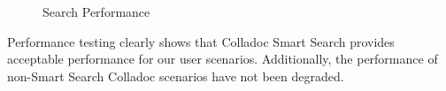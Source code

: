 \begin{figure}[h!t]
\begin{center}
\leavevmode
{}
\end{center}
\caption{Search Performance}
\label{fig:search-performance}
\end{figure}


Performance testing clearly shows that Colladoc Smart Search provides acceptable performance for our user scenarios. Additionally, the performance of non-Smart Search Colladoc scenarios have not been degraded.